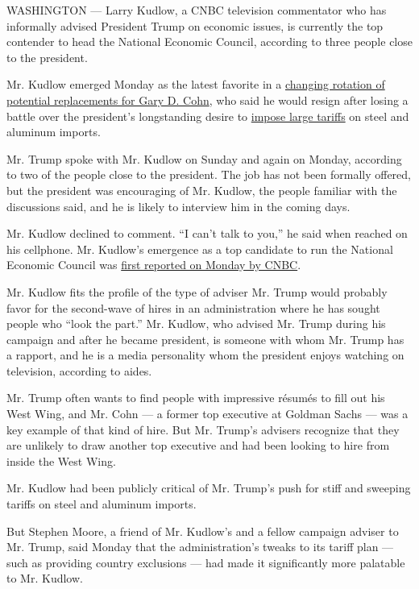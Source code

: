 WASHINGTON --- Larry Kudlow, a CNBC television commentator who has
informally advised President Trump on economic issues, is currently the
top contender to head the National Economic Council, according to three
people close to the president.

Mr. Kudlow emerged Monday as the latest favorite in a
\href{https://www.nytimes3xbfgragh.onion/2018/03/10/us/politics/christopher-liddell-trump.html}{changing
rotation of potential replacements for Gary D. Cohn}, who said he would
resign after losing a battle over the president's longstanding desire to
\href{https://www.nytimes3xbfgragh.onion/2018/03/08/us/politics/trump-tariff-announcement.html}{impose
large tariffs} on steel and aluminum imports.

Mr. Trump spoke with Mr. Kudlow on Sunday and again on Monday, according
to two of the people close to the president. The job has not been
formally offered, but the president was encouraging of Mr. Kudlow, the
people familiar with the discussions said, and he is likely to interview
him in the coming days.

Mr. Kudlow declined to comment. ``I can't talk to you,'' he said when
reached on his cellphone. Mr. Kudlow's emergence as a top candidate to
run the National Economic Council was
\href{https://t.co/JB5Gr8KXDm?amp=1}{first reported on Monday by CNBC}.

Mr. Kudlow fits the profile of the type of adviser Mr. Trump would
probably favor for the second-wave of hires in an administration where
he has sought people who ``look the part.'' Mr. Kudlow, who advised Mr.
Trump during his campaign and after he became president, is someone with
whom Mr. Trump has a rapport, and he is a media personality whom the
president enjoys watching on television, according to aides.

Mr. Trump often wants to find people with impressive résumés to fill out
his West Wing, and Mr. Cohn --- a former top executive at Goldman Sachs
--- was a key example of that kind of hire. But Mr. Trump's advisers
recognize that they are unlikely to draw another top executive and had
been looking to hire from inside the West Wing.

Mr. Kudlow had been publicly critical of Mr. Trump's push for stiff and
sweeping tariffs on steel and aluminum imports.

But Stephen Moore, a friend of Mr. Kudlow's and a fellow campaign
adviser to Mr. Trump, said Monday that the administration's tweaks to
its tariff plan --- such as providing country exclusions --- had made it
significantly more palatable to Mr. Kudlow.

